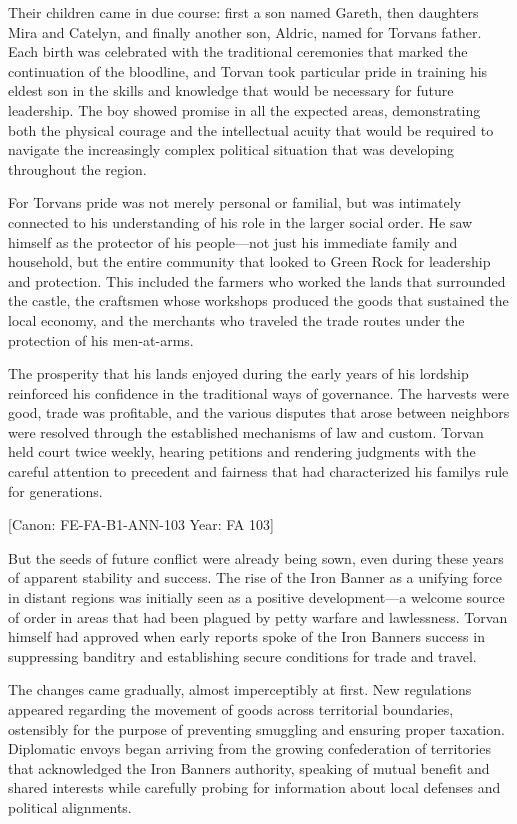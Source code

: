 Their children came in due course: first a son named Gareth, then
daughters Mira and Catelyn, and finally another son, Aldric, named for
Torvan\textquotesingle s father. Each birth was celebrated with the
traditional ceremonies that marked the continuation of the bloodline,
and Torvan took particular pride in training his eldest son in the
skills and knowledge that would be necessary for future leadership. The
boy showed promise in all the expected areas, demonstrating both the
physical courage and the intellectual acuity that would be required to
navigate the increasingly complex political situation that was
developing throughout the region.

For Torvan\textquotesingle s pride was not merely personal or familial,
but was intimately connected to his understanding of his role in the
larger social order. He saw himself as the protector of his people---not
just his immediate family and household, but the entire community that
looked to Green Rock for leadership and protection. This included the
farmers who worked the lands that surrounded the castle, the craftsmen
whose workshops produced the goods that sustained the local economy, and
the merchants who traveled the trade routes under the protection of his
men-at-arms.

The prosperity that his lands enjoyed during the early years of his
lordship reinforced his confidence in the traditional ways of
governance. The harvests were good, trade was profitable, and the
various disputes that arose between neighbors were resolved through the
established mechanisms of law and custom. Torvan held court twice
weekly, hearing petitions and rendering judgments with the careful
attention to precedent and fairness that had characterized his
family\textquotesingle s rule for generations.

{[}Canon: FE-FA-B1-ANN-103 \textbar{} Year: FA 103{]}

But the seeds of future conflict were already being sown, even during
these years of apparent stability and success. The rise of the Iron
Banner as a unifying force in distant regions was initially seen as a
positive development---a welcome source of order in areas that had been
plagued by petty warfare and lawlessness. Torvan himself had approved
when early reports spoke of the Iron Banner\textquotesingle s success in
suppressing banditry and establishing secure conditions for trade and
travel.

The changes came gradually, almost imperceptibly at first. New
regulations appeared regarding the movement of goods across territorial
boundaries, ostensibly for the purpose of preventing smuggling and
ensuring proper taxation. Diplomatic envoys began arriving from the
growing confederation of territories that acknowledged the Iron
Banner\textquotesingle s authority, speaking of mutual benefit and
shared interests while carefully probing for information about local
defenses and political alignments.

